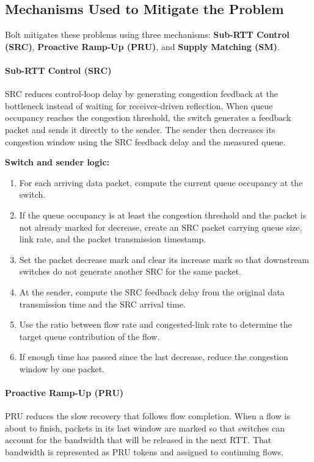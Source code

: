 \subsection{Mechanisms Used to Mitigate the Problem}

Bolt mitigates these problems using three mechanisms: \textbf{Sub-RTT Control (SRC)}, \textbf{Proactive Ramp-Up (PRU)}, and \textbf{Supply Matching (SM)}.

\paragraph{Sub-RTT Control (SRC)}
SRC reduces control-loop delay by generating congestion feedback at the bottleneck instead of waiting for receiver-driven reflection. When queue occupancy reaches the congestion threshold, the switch generates a feedback packet and sends it directly to the sender. The sender then decreases its congestion window using the SRC feedback delay and the measured queue.

\textbf{Switch and sender logic:}
\begin{enumerate}
\item For each arriving data packet, compute the current queue occupancy at the switch.
\item If the queue occupancy is at least the congestion threshold and the packet is not already marked for decrease, create an SRC packet carrying queue size, link rate, and the packet transmission timestamp.
\item Set the packet decrease mark and clear its increase mark so that downstream switches do not generate another SRC for the same packet.
\item At the sender, compute the SRC feedback delay from the original data transmission time and the SRC arrival time.
\item Use the ratio between flow rate and congested-link rate to determine the target queue contribution of the flow.
\item If enough time has passed since the last decrease, reduce the congestion window by one packet.
\end{enumerate}

\paragraph{Proactive Ramp-Up (PRU)}
PRU reduces the slow recovery that follows flow completion. When a flow is about to finish, packets in its last window are marked so that switches can account for the bandwidth that will be released in the next RTT. That bandwidth is represented as PRU tokens and assigned to continuing flows.

